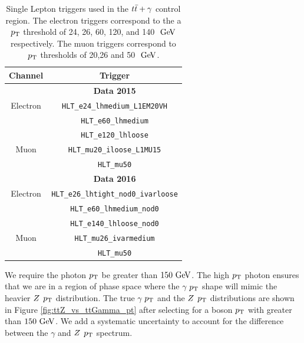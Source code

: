 \begin{table}[h!]
  \begin{center}
    \begin{tabular}{c|c} \hline\hline
      Channel & Trigger \\  \hline
              & {\bf Data 2015} \\ \hline
      Electron & \verb+HLT_e24_lhmedium_L1EM20VH+  \\
      	            & \verb+HLT_e60_lhmedium+ \\
	            & \verb+HLT_e120_lhloose+         \\  
      Muon & \verb+HLT_mu20_iloose_L1MU15+ \\
      	       & \verb+HLT_mu50+ \\
      \hline
              & {\bf Data 2016} \\ \hline
      Electron & \verb+HLT_e26_lhtight_nod0_ivarloose+ \\
                     &\verb+HLT_e60_lhmedium_nod0+ \\
                     &\verb+HLT_e140_lhloose_nod0+         \\ 
      Muon & \verb+HLT_mu26_ivarmedium+ \\ 
                & \verb+HLT_mu50+ \\
      \hline \hline
    \end{tabular}
  \end{center}
  \caption{Single Lepton triggers used in the $t\bar{t}+\gamma$ control region.  The electron triggers correspond to the a $p_{\mathrm{T}}$ threshold of 24, 26, 60, 120, and 140 $\gev$ respectively.  The muon triggers correspond to $p_{\mathrm{T}}$ thresholds of 20,26 and 50 $\gev$. }
  \label{tb:lepTriggers}
\end{table}

\indent We require the photon $p_{\mathrm{T}}$ be greater than $150\gev$.  The high $p_{\mathrm{T}}$ photon ensures that we are in a region of phase space where the $\gamma$ $p_{\mathrm{T}}$ shape will mimic the heavier $Z$ $p_{\mathrm{T}}$ distribution.  The true $\gamma$ $p_{\mathrm{T}}$ and the $Z$ $p_{\mathrm{T}}$ distributions are shown in Figure \ref{fig:ttZ_vs_ttGamma_pt} after selecting for a boson $p_{\mathrm{T}}$ with greater than $150 \gev$.  We add a systematic uncertainty to account for the difference between the $\gamma$ and $Z$ $p_{\mathrm{T}}$ spectrum. \\

\pagebreak

